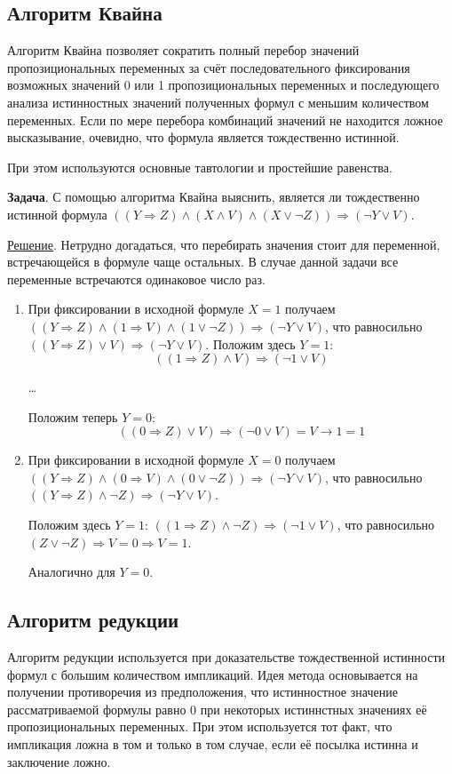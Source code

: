 \subsection{Алгоритм Квайна}
Алгоритм Квайна позволяет сократить полный перебор значений пропозициональных переменных за счёт последовательного фиксирования возможных значений 0 или 1 пропозициональных переменных и последующего анализа истинностных значений полученных формул с меньшим количеством переменных. Если по мере перебора комбинаций значений не находится ложное высказывание, очевидно, что формула является тождественно истинной.

При этом используются основные тавтологии и простейшие равенства.

\textbf{Задача}. С помощью алгоритма Квайна выяснить, является ли тождественно истинной формула $((Y \Rightarrow Z) \land (X \land V) \land (X \lor \lnot Z)) \Rightarrow (\lnot Y \lor V)$.

\underline{Решение}. Нетрудно догадаться, что перебирать значения стоит для переменной, встречающейся в формуле чаще остальных. В случае данной задачи все переменные встречаются одинаковое число раз.
\begin{enumerate}
    \item При фиксировании в исходной формуле $X = 1$ получаем $((Y \Rightarrow Z) \land (1 \Rightarrow V) \land (1 \lor \lnot Z)) \Rightarrow (\lnot Y \lor V)$, что равносильно $((Y \Rightarrow Z) \lor V) \Rightarrow (\lnot Y \lor V)$. Положим здесь $Y = 1$: $$((1 \Rightarrow Z) \land V) \Rightarrow (\lnot 1 \lor V)$$
    
    \dots

    Положим теперь $Y = 0$: $$((0 \Rightarrow Z) \lor V) \Rightarrow (\lnot 0 \lor V) = V \rightarrow 1 =  1$$

    \item При фиксировании в исходной формуле $X = 0$ получаем $((Y \Rightarrow Z) \land (0 \Rightarrow V) \land (0 \lor \lnot Z)) \Rightarrow (\lnot Y \lor V)$,  что равносильно  $((Y \Rightarrow Z) \land \lnot Z) \Rightarrow (\lnot Y \lor V)$.
    
    Положим здесь $Y = 1$: $((1 \Rightarrow Z) \land \lnot Z) \Rightarrow (\lnot 1 \lor V)$, что равносильно $(Z \lor \lnot Z) \Rightarrow V = 0 \Rightarrow V = 1$.

    Аналогично для $Y=0$.
\end{enumerate}

\subsection{Алгоритм редукции}
Алгоритм редукции используется при доказательстве тождественной истинности формул с большим количеством импликаций. Идея метода основывается на получении противоречия из предположения, что истинностное значение рассматриваемой формулы равно 0 при некоторых истиннстных значениях её пропозициональных переменных. При этом используется тот факт, что импликация ложна в том и только в том случае, если её посылка истинна и заключение ложно.